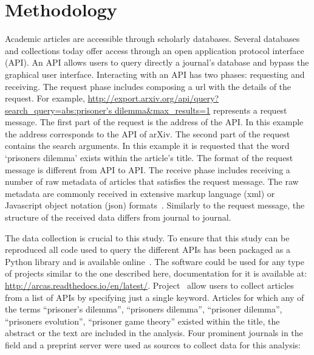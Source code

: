 \documentclass{article}
\theoremstyle{definition}
\begin{document}
\section{Methodology}\label{section:methodology}

Academic articles are accessible through scholarly databases. Several databases
and collections today offer access through an open application protocol
interface (API). An API allows users to query directly a journal's database and
bypass the graphical user interface. Interacting with an API has two phases:
requesting and receiving. The request phase includes composing a url with the
details of the request. For example,
\url{http://export.arxiv.org/api/query?search_query=abs:prisoner's
dilemma&max_results=1} represents a request message. The first part of the
request is the address of the API. In this example the address corresponds to
the API of arXiv. The second part of the request contains the search arguments.
In this example it is requested that the word `prisoners dilemma' exists within
the article's title. The format of the request message is different from API to
API. The receive phase includes receiving a number of raw metadata of articles
that satisfies the request message. The raw metadata are commonly received in
extensive markup language (xml) or Javascript object notation (json)
formats~\cite{nurseitov2009}. Similarly to the request message, the structure of
the received data differs from journal
to journal.

The data collection is crucial to this study. To ensure that this study can be
reproduced all code used to query the different APIs has been packaged as a
Python library and is available online~\cite{nikoleta_2017}. The software could
be used for any type of projects similar to the one described here,
documentation for it is available at:
\url{http://arcas.readthedocs.io/en/latest/}. Project~\cite{nikoleta_2017} allow
users to collect articles from a list of APIs by specifying just a single
keyword. Articles for which any of the terms ``prisoner's dilemma'',
``prisoners dilemma'', ``prisoner dilemma'', ``prisoners evolution'', ``prisoner
game theory'' existed within the title, the abstract or the text are included
in the analysis. Four prominent journals in the field and a preprint server
were used as sources to collect data for this analysis:
\end{document}
